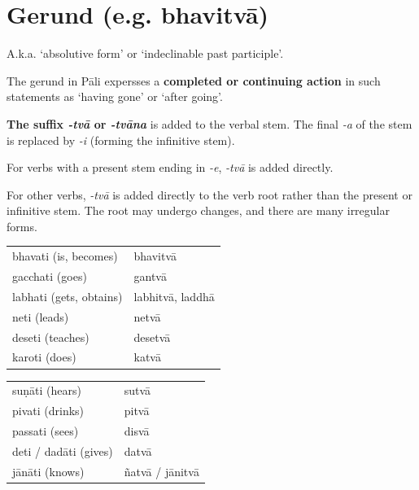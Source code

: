 \documentclass[11pt,oneside]{memoir}
\begin{document}
\normalArrayStretch

\clearpage
\section{Gerund (e.g. bhavitvā)}
\label{sec:orgd4dd0a5}

A.k.a. `absolutive form' or `indeclinable past participle'.

The gerund in Pāli expersses a \textbf{completed or continuing action} in such statements as `having gone' or `after going'.

\textbf{The suffix \emph{-tvā} or \emph{-tvāna}} is added to the verbal stem. The final \emph{-a} of the
stem is replaced by \emph{-i} (forming the infinitive stem).

For verbs with a present stem ending in \emph{-e}, \emph{-tvā} is added directly.

For other verbs, \emph{-tvā} is added directly to the verb root rather than the
present or infinitive stem. The root may undergo changes, and there are many
irregular forms.

\bigskip
\begin{multicols}{2}

\begin{center}
\begin{tabular}{ll}
bhavati (is, becomes) & bhavitvā\\
gacchati (goes) & gantvā\\
labhati (gets, obtains) & labhitvā, laddhā\\
neti (leads) & netvā\\
deseti (teaches) & desetvā\\
karoti (does) & katvā\\
\end{tabular}
\end{center}

\columnbreak

\begin{center}
\begin{tabular}{ll}
suṇāti (hears) & sutvā\\
pivati (drinks) & pitvā\\
passati (sees) & disvā\\
deti / dadāti (gives) & datvā\\
jānāti (knows) & ñatvā / jānitvā\\
\end{tabular}
\end{center}

\end{multicols}
\end{document}
